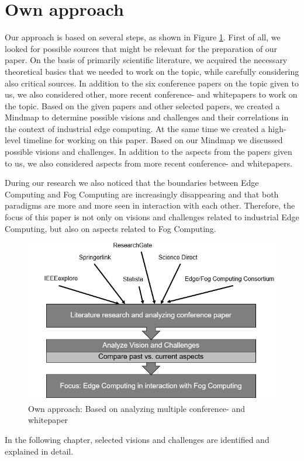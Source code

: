 \section{Own approach}\label{sec:approach}\par
Our approach is based on several steps, as shown in Figure \ref{fig:our_approach}. First of all, we looked for possible sources that might be relevant for the preparation of our paper. 
On the basis of primarily scientific literature, we acquired the necessary theoretical basics that we needed to work on the topic, while carefully considering also critical sources.
In addition to the six conference papers on the topic given to us, we also considered other, more recent conference- and whitepapers to work on the topic.
Based on the given papers and other selected papers, we created a Mindmap to determine possible visions and challenges and their correlations in the context of industrial edge computing. At the same time we created a high-level timeline for working on this paper.
Based on our Mindmap we discussed possible visions and challenges. In addition to the aspects from the papers given to us, we also considered aspects from more recent conference- and whitepapers.\par
During our research we also noticed that the boundaries between Edge Computing and Fog Computing are increasingly disappearing and that both paradigms are more and more seen in interaction with each other.
Therefore, the focus of this paper is not only on visions and challenges related to industrial Edge Computing, but also on aspects related to Fog Computing.

\begin{figure}[h]
    \includegraphics[width=1\textwidth,height=0.65\textwidth]{resources/images/our_approach.png}
    \caption{Own approach: Based on analyzing multiple conference- and whitepaper}
    \label{fig:our_approach}
\end{figure}

In the following chapter, selected visions and challenges are identified and explained in detail.